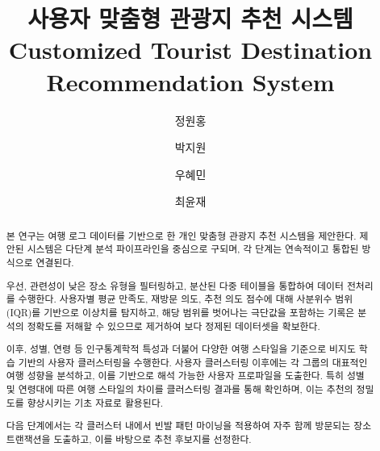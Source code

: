 \documentclass[sigconf]{acmart}
\begin{document}
\begin{CJK}{UTF8}{mj}


\acmISBN{}
\acmDOI{}


\title{사용자 맞춤형 관광지 추천 시스템\\[1em]
Customized Tourist Destination Recommendation System\\[1.5em]}

\author{정원홍}

\author{박지원}

\author{우혜민}

\author{최윤재}


\begin{abstract}

본 연구는 여행 로그 데이터를 기반으로 한 개인 맞춤형 관광지 추천 시스템을 제안한다. 제안된 시스템은 다단계 분석 파이프라인을 중심으로 구되며, 각 단계는 연속적이고 통합된 방식으로 연결된다.

우선, 관련성이 낮은 장소 유형을 필터링하고, 분산된 다중 테이블을 통합하여 데이터 전처리를 수행한다. 사용자별 평균 만족도, 재방문 의도, 추천 의도 점수에 대해 사분위수 범위(IQR)를 기반으로 이상치를 탐지하고, 해당 범위를 벗어나는 극단값을 포함하는 기록은 분석의 정확도를 저해할 수 있으므로 제거하여 보다 정제된 데이터셋을 확보한다.

이후, 성별, 연령 등 인구통계학적 특성과 더불어 다양한 여행 스타일을 기준으로 비지도 학습 기반의 사용자 클러스터링을 수행한다. 사용자 클러스터링 이후에는 각 그룹의 대표적인 여행 성향을 분석하고, 이를 기반으로 해석 가능한 사용자 프로파일을 도출한다. 특히 성별 및 연령대에 따른 여행 스타일의 차이를 클러스터링 결과를 통해 확인하며, 이는 추천의 정밀도를 향상시키는 기초 자료로 활용된다.

다음 단계에서는 각 클러스터 내에서 빈발 패턴 마이닝을 적용하여 자주 함께 방문되는 장소 트랜잭션을 도출하고, 이를 바탕으로 추천 후보지를 선정한다. 


\end{abstract}
\end{CJK}
\end{document}
